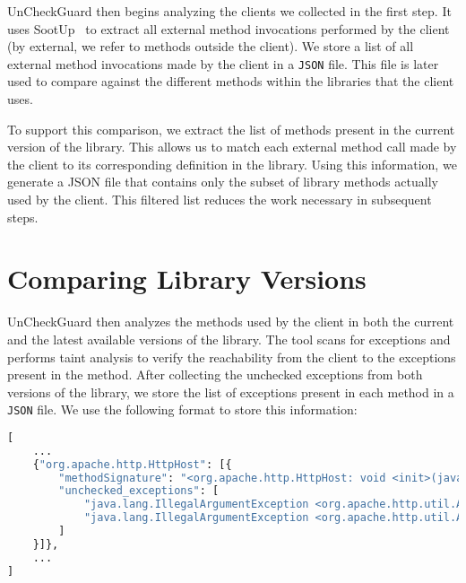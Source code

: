 
UnCheckGuard then begins analyzing the clients we collected in the first step. It uses SootUp~\cite{Karakaya24:_SootUp} to extract all external method invocations performed by the client (by external, we refer to methods outside the client). We store a list of all external method invocations made by the client in a \texttt{JSON} file. This file is later used to compare against the different methods within the libraries that the client uses.

To support this comparison, we extract the list of methods present in the current version of the library. This allows us to match each external method call made by the client to its corresponding definition in the library. Using this information, we generate a JSON file that contains only the subset of library methods actually used by the client. This filtered list reduces the work necessary in subsequent steps.


\section{Comparing Library Versions}

UnCheckGuard then analyzes the methods used by the client in both the current and the latest available versions of the library. The tool scans for exceptions and performs taint analysis to verify the reachability from the client to the exceptions present in the method. After collecting the unchecked exceptions from both versions of the library, we store the list of exceptions present in each method in a \texttt{JSON} file. We use the following format to store this information:
\begin{lstlisting}[language=python]
[
    ...
    {"org.apache.http.HttpHost": [{
        "methodSignature": "<org.apache.http.HttpHost: void <init>(java.lang.String,int)>",
        "unchecked_exceptions": [
            "java.lang.IllegalArgumentException <org.apache.http.util.Args: java.lang.CharSequence containsNoBlanks(java.lang.CharSequence,java.lang.String)>",
            "java.lang.IllegalArgumentException <org.apache.http.util.Args: java.lang.CharSequence containsNoBlanks(java.lang.CharSequence,java.lang.String)>"
        ]
    }]},
    ...
]
\end{lstlisting}

